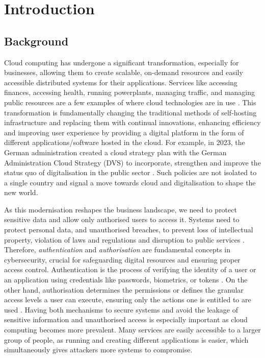 \chapter{Introduction}
\section{Background}
Cloud computing has undergone a significant transformation, especially for businesses, allowing them to create scalable, on-demand resources and easily accessible distributed systems for their applications.
Services like accessing finances, accessing health, running powerplants, managing traffic, and managing public resources are a few examples of where cloud technologies are in use \citep{intro_cloud_critical_infra}.
This transformation is fundamentally changing the traditional methods of self-hosting infrastructure and replacing them with continual innovations, enhancing efficiency and improving user experience by providing a digital platform in the form of different applications/software hosted in the cloud.
For example, in 2023, the German administration created a cloud strategy plan with the German Administration Cloud Strategy (DVS) to incorporate, strengthen and improve the status quo of digitalisation in the public sector \citep{german_gov_cloud_plan}.
Such policies are not isolated to a single country and signal a move towards cloud and digitalisation to shape the new world. \newline

As this modernisation reshapes the business landscape, we need to protect sensitive data and allow only authorised users to access it.
Systems need to protect personal data, and unauthorised breaches, to prevent loss of intellectual property, violation of laws and regulations and disruption to public services \citep{critical_infra_reason}.
Therefore, \textit{authentication} and \textit{authorisation} are fundamental concepts in cybersecurity, crucial for safeguarding digital resources and ensuring proper access control.
\newline
Authentication is the process of verifying the identity of a user or an application using credentials like passwords, biometrics, or tokens \citep{authetication_intro}.
On the other hand, authorisation determines the permissions or defines the granular access levels a user can execute, ensuring only the actions one is entitled to are used \citep{Gollmann2021-at}.
Having both mechanisms to secure systems and avoid the leakage of sensitive information and unauthorised access is especially important as cloud computing becomes more prevalent.
Many services are easily accessible to a larger group of people, as running and creating different applications is easier, which simultaneously gives attackers more systems to compromise.\newline

